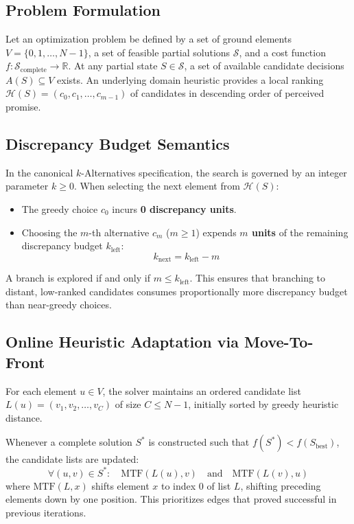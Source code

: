 \documentclass[11pt,a4paper]{article}
\begin{document}
\subsection{Problem Formulation}
Let an optimization problem be defined by a set of ground elements $V = \{0, 1, \dots, N-1\}$, a set of feasible partial solutions $\mathcal{S}$, and a cost function $f: \mathcal{S}_{\text{complete}} \to \mathbb{R}$. At any partial state $S \in \mathcal{S}$, a set of available candidate decisions $A(S) \subseteq V$ exists. An underlying domain heuristic provides a local ranking $\mathcal{H}(S) = (c_0, c_1, \dots, c_{m-1})$ of candidates in descending order of perceived promise.

\subsection{Discrepancy Budget Semantics}
In the canonical $k$-Alternatives specification, the search is governed by an integer parameter $k \ge 0$. When selecting the next element from $\mathcal{H}(S)$:
\begin{itemize}
    \item The greedy choice $c_0$ incurs \textbf{0 discrepancy units}.
    \item Choosing the $m$-th alternative $c_m$ ($m \ge 1$) expends \textbf{$m$ units} of the remaining discrepancy budget $k_{\text{left}}$:
    \begin{equation}
        k_{\text{next}} = k_{\text{left}} - m
    \end{equation}
\end{itemize}
A branch is explored if and only if $m \le k_{\text{left}}$. This ensures that branching to distant, low-ranked candidates consumes proportionally more discrepancy budget than near-greedy choices.

\subsection{Online Heuristic Adaptation via Move-To-Front}
For each element $u \in V$, the solver maintains an ordered candidate list $L(u) = (v_1, v_2, \dots, v_C)$ of size $C \le N-1$, initially sorted by greedy heuristic distance.

Whenever a complete solution $S^*$ is constructed such that $f(S^*) < f(S_{\text{best}})$, the candidate lists are updated:
\begin{equation}
    \forall (u, v) \in S^*: \quad \text{MTF}(L(u), v) \quad \text{and} \quad \text{MTF}(L(v), u)
\end{equation}
where $\text{MTF}(L, x)$ shifts element $x$ to index 0 of list $L$, shifting preceding elements down by one position. This prioritizes edges that proved successful in previous iterations.
\end{document}
